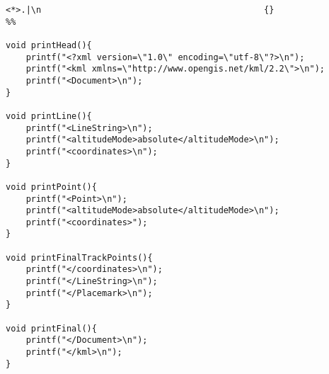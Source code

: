 \documentclass{llncs}
\begin{document}
\begin{changemargin}{-4cm}{0cm}
\begin{verbatim}
<*>.|\n                                            {}
%%

void printHead(){
    printf("<?xml version=\"1.0\" encoding=\"utf-8\"?>\n");
    printf("<kml xmlns=\"http://www.opengis.net/kml/2.2\">\n");
    printf("<Document>\n");
}

void printLine(){
    printf("<LineString>\n");
    printf("<altitudeMode>absolute</altitudeMode>\n");
    printf("<coordinates>\n");
}

void printPoint(){
    printf("<Point>\n");
    printf("<altitudeMode>absolute</altitudeMode>\n");
    printf("<coordinates>");
}

void printFinalTrackPoints(){
    printf("</coordinates>\n");
    printf("</LineString>\n");
    printf("</Placemark>\n");
}

void printFinal(){
    printf("</Document>\n");
    printf("</kml>\n");
}
\end{verbatim}
\end{changemargin}
\end{document}

